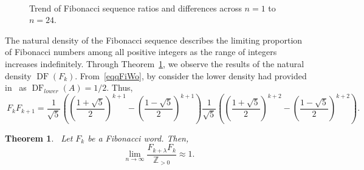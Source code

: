 \documentclass[11pt, a4paper]{article}
\newtheorem{theorem}{Theorem}[section]
\theoremstyle{definition}
\begin{document}
\begin{figure}[H]
    \caption{Trend of Fibonacci sequence ratios and differences across $n=1$ to $n=24$.}~\label{figtabfib24}
\end{figure}

The natural density of the Fibonacci sequence describes the limiting proportion of Fibonacci numbers among all positive integers as the range of integers increases indefinitely. Through Theorem~\ref{generalthmn2}, we observe the results of the natural density $\operatorname{DF}(F_k)$. From~\eqref{eqqFiWo}, by consider the lower density had provided in~\cite{Niven1951} as $\operatorname{DF}_{lower}(A)=1/2$. Thus,  
\begin{equation}~\label{eqqFiWon2}
F_kF_{k+1}=\frac{1}{\sqrt{5}}\left(\left(\frac{1+\sqrt{5}}{2}\right)^{k+1}-\left(\frac{1-\sqrt{5}}{2}\right)^{k+1}\right)\frac{1}{\sqrt{5}}\left(\left(\frac{1+\sqrt{5}}{2}\right)^{k+2}-\left(\frac{1-\sqrt{5}}{2}\right)^{k+2}\right).
\end{equation}
\begin{theorem}~\label{generalthmn2}
Let $F_k$ be a Fibonacci word. Then, 
\begin{equation}~\label{eq1generalthmn2}
\lim_{n\to \infty}\frac{F_{k+\lambda}F_{k}}{\mathbb{Z}_{>0}} \approx 1.
\end{equation}
\end{theorem}
\end{document}
